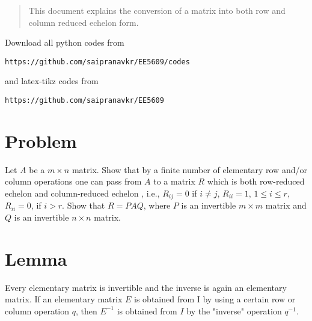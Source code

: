 \documentclass[journal,12pt,twocolumn]{IEEEtran}
\begin{document}
%
\begin{abstract}
This document explains the conversion of a matrix into both row and column reduced echelon form.
\end{abstract}
Download all python codes from 
%
\begin{lstlisting}
https://github.com/saipranavkr/EE5609/codes
\end{lstlisting}
%
and latex-tikz codes from 
%
\begin{lstlisting}
https://github.com/saipranavkr/EE5609
\end{lstlisting}
%
\renewcommand{\theenumi}{\roman{enumi}}%
\section{Problem}
Let $A$ be a $m\times n$ matrix. Show that by a finite number of elementary row and/or column operations one can pass from $A$ to a matrix $R$ which is both row-reduced echelon and column-reduced echelon , i.e., $R_{ij}=0$ if $i\neq j$, $R_{ii}=1$, $1\leq i\leq r$, $R_{ii}=0$, if $i>r$. Show that $R = PAQ$, where $P$ is an invertible $m\times m$ matrix and $Q$ is an invertible $n\times n$ matrix.
%
%
\section{Lemma}
Every elementary matrix is invertible and the inverse is again an elementary matrix. If an elementary matrix $E$ is obtained from I by using a certain row or column operation $q$, then $E^{-1}$ is obtained from $I$ by the "inverse" operation $q^{-1}$.
\end{document}
